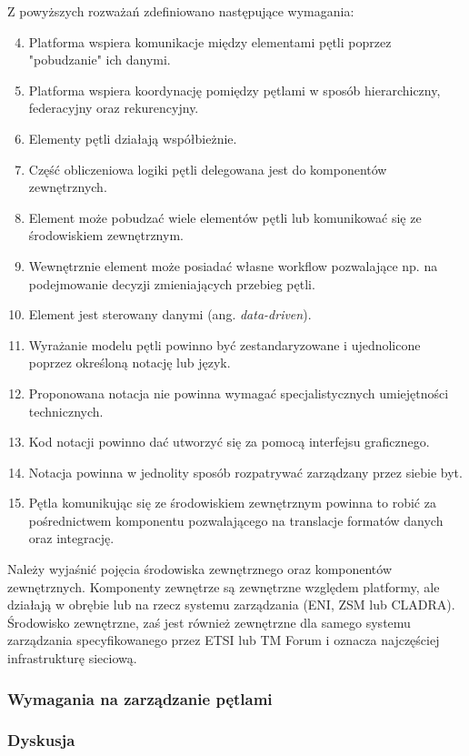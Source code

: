 Z powyższych rozważań zdefiniowano następujące wymagania:
\begin{enumerate}
    \setcounter{enumi}{3} 
    \item \label{req:4} Platforma wspiera komunikacje między elementami pętli poprzez "pobudzanie" ich danymi.
    \item \label{req:5} Platforma wspiera koordynację pomiędzy pętlami w sposób hierarchiczny, federacyjny oraz rekurencyjny.
    \item \label{req:6} Elementy pętli działają współbieżnie.
    \item \label{req:7} Część obliczeniowa logiki pętli delegowana jest do komponentów zewnętrznych.
    \item \label{req:8} Element może pobudzać wiele elementów pętli lub komunikować się ze środowiskiem zewnętrznym.
    \item \label{req:9} Wewnętrznie element może posiadać własne workflow pozwalające np. na podejmowanie decyzji zmieniających przebieg pętli.
    \item \label{req:10} Element jest sterowany danymi (ang. \textit{data-driven}).
    \item \label{req:11} Wyrażanie modelu pętli powinno być zestandaryzowane i ujednolicone poprzez określoną notację lub język.
    \item \label{req:12} Proponowana notacja nie powinna wymagać specjalistycznych umiejętności technicznych.
    \item \label{req:13} Kod notacji powinno dać utworzyć się za pomocą interfejsu graficznego.
    \item \label{req:14} Notacja powinna w jednolity sposób rozpatrywać zarządzany przez siebie byt.
    \item \label{req:15} Pętla komunikując się ze środowiskiem zewnętrznym powinna to robić za pośrednictwem komponentu pozwalającego na translacje formatów danych oraz integrację.
\end{enumerate}

Należy wyjaśnić pojęcia środowiska zewnętrznego oraz komponentów zewnętrznych. Komponenty zewnętrze są zewnętrzne względem platformy, ale działają w obrębie lub na rzecz systemu zarządzania (ENI, ZSM lub CLADRA). Środowisko zewnętrzne, zaś jest również zewnętrzne dla samego systemu zarządzania specyfikowanego przez ETSI lub TM Forum i oznacza najczęściej infrastrukturę sieciową. 

\subsubsection{Wymagania na zarządzanie pętlami}

\subsubsection{Dyskusja}


